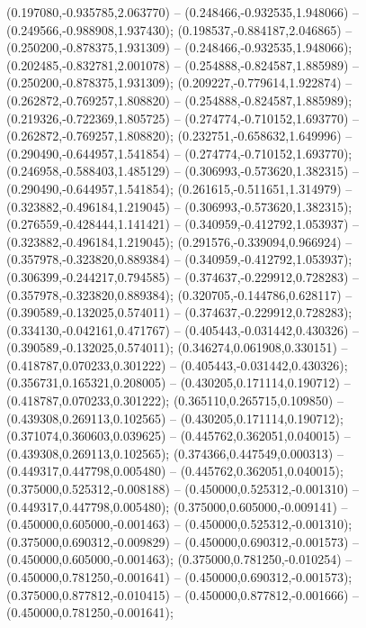  (0.197080,-0.935785,2.063770) -- (0.248466,-0.932535,1.948066) -- (0.249566,-0.988908,1.937430);
 (0.198537,-0.884187,2.046865) -- (0.250200,-0.878375,1.931309) -- (0.248466,-0.932535,1.948066);
 (0.202485,-0.832781,2.001078) -- (0.254888,-0.824587,1.885989) -- (0.250200,-0.878375,1.931309);
 (0.209227,-0.779614,1.922874) -- (0.262872,-0.769257,1.808820) -- (0.254888,-0.824587,1.885989);
 (0.219326,-0.722369,1.805725) -- (0.274774,-0.710152,1.693770) -- (0.262872,-0.769257,1.808820);
 (0.232751,-0.658632,1.649996) -- (0.290490,-0.644957,1.541854) -- (0.274774,-0.710152,1.693770);
 (0.246958,-0.588403,1.485129) -- (0.306993,-0.573620,1.382315) -- (0.290490,-0.644957,1.541854);
 (0.261615,-0.511651,1.314979) -- (0.323882,-0.496184,1.219045) -- (0.306993,-0.573620,1.382315);
 (0.276559,-0.428444,1.141421) -- (0.340959,-0.412792,1.053937) -- (0.323882,-0.496184,1.219045);
 (0.291576,-0.339094,0.966924) -- (0.357978,-0.323820,0.889384) -- (0.340959,-0.412792,1.053937);
 (0.306399,-0.244217,0.794585) -- (0.374637,-0.229912,0.728283) -- (0.357978,-0.323820,0.889384);
 (0.320705,-0.144786,0.628117) -- (0.390589,-0.132025,0.574011) -- (0.374637,-0.229912,0.728283);
 (0.334130,-0.042161,0.471767) -- (0.405443,-0.031442,0.430326) -- (0.390589,-0.132025,0.574011);
 (0.346274,0.061908,0.330151) -- (0.418787,0.070233,0.301222) -- (0.405443,-0.031442,0.430326);
 (0.356731,0.165321,0.208005) -- (0.430205,0.171114,0.190712) -- (0.418787,0.070233,0.301222);
 (0.365110,0.265715,0.109850) -- (0.439308,0.269113,0.102565) -- (0.430205,0.171114,0.190712);
 (0.371074,0.360603,0.039625) -- (0.445762,0.362051,0.040015) -- (0.439308,0.269113,0.102565);
 (0.374366,0.447549,0.000313) -- (0.449317,0.447798,0.005480) -- (0.445762,0.362051,0.040015);
 (0.375000,0.525312,-0.008188) -- (0.450000,0.525312,-0.001310) -- (0.449317,0.447798,0.005480);
 (0.375000,0.605000,-0.009141) -- (0.450000,0.605000,-0.001463) -- (0.450000,0.525312,-0.001310);
 (0.375000,0.690312,-0.009829) -- (0.450000,0.690312,-0.001573) -- (0.450000,0.605000,-0.001463);
 (0.375000,0.781250,-0.010254) -- (0.450000,0.781250,-0.001641) -- (0.450000,0.690312,-0.001573);
 (0.375000,0.877812,-0.010415) -- (0.450000,0.877812,-0.001666) -- (0.450000,0.781250,-0.001641);
